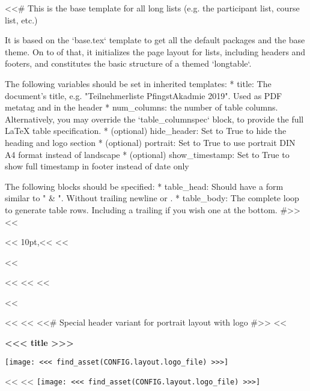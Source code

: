<<# This is the base template for all long lists (e.g. the participant list, course list, etc.)

    It is based on the `base.tex` template to get all the default packages and the base theme. On to of that, it
    initializes the page layout for lists, including headers and footers, and constitutes the basic structure of a
    themed `longtable`.

    The following variables should be set in inherited templates:
      * title: The document's title, e.g. "Teilnehmerliste PfingstAkadmie 2019". Used as PDF metatag and in the header
      * num_columns: the number of table columns. Alternatively, you may override the `table_columnspec` block, to
        provide the full LaTeX table specification.
      * (optional) hide_header: Set to True to hide the heading and logo section
      * (optional) portrait: Set to True to use portrait DIN A4 format instead of landscape
      * (optional) show_timestamp: Set to True to show full timestamp in footer instead of date only

    The following blocks should be specified:
      * table_head: Should have a form similar to " & ". Without trailing newline
        or \hline.
      * table_body: The complete loop to generate table rows. Including a trailing \hline if you wish one at the bottom.
#>>
<<%


<<%
    10pt,<<%
<<%


<<%
    \geometry{left=1cm,right=1cm}

    \cfoot[]{}
    <<%
    <<%
    <<%

    \newcommand{\head}[1]{\textcolor{white}{\textbf{#1}}}
<<%

<<%
    <<%
        \thispagestyle{plain}
        <<# Special header variant for portrait layout with logo #>>
        <<%
            \begin{minipage}[c]{\textwidth-3cm}%
                \headingfamily\bfseries\huge{}<<< title >>>
            \end{minipage}%
            \begin{minipage}[c]{3cm}%
                \texttt{[image: <<< find\_asset(CONFIG.layout.logo\_file) >>>]}
            \end{minipage}
        <<%
            <<%
                \hspace*{\fill}\texttt{[image: <<< find\_asset(CONFIG.layout.logo\_file) >>>]}\\

